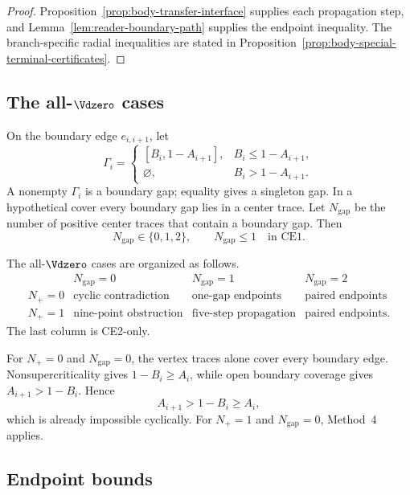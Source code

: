 \begin{proof}
Proposition~\ref{prop:body-transfer-interface} supplies each propagation step,
and Lemma~\ref{lem:reader-boundary-path} supplies the endpoint inequality.
The branch-specific radial inequalities are stated in
Proposition~\ref{prop:body-special-terminal-certificates}.
\end{proof}

\subsection{The all-$\Vdzero$ cases}

\begin{definition}
\label{def:body-active-gap-rank}
On the boundary edge $e_{i,i+1}$, let
\[
 \Gamma_i=
 \begin{cases}
 [B_i,1-A_{i+1}],&B_i\le1-A_{i+1},\\
 \varnothing,&B_i>1-A_{i+1}.
 \end{cases}
\]
A nonempty $\Gamma_i$ is a boundary gap; equality gives a singleton gap.  In
a hypothetical cover every boundary gap lies in a center trace.  Let
$N_{\mathrm{gap}}$ be the number of positive center traces that contain a
boundary gap.  Then
\[
 N_{\mathrm{gap}}\in\{0,1,2\},
 \qquad
 N_{\mathrm{gap}}\le1\quad\text{in CE1}.
\]
\end{definition}

The all-$\Vdzero$ cases are organized as follows.
\[
\begin{array}{c|ccc}
 &N_{\mathrm{gap}}=0&N_{\mathrm{gap}}=1&N_{\mathrm{gap}}=2\\ \hline
N_+=0&\text{cyclic contradiction}&\text{one-gap endpoints}&
       \text{paired endpoints}\\
N_+=1&\text{nine-point obstruction}&\text{five-step propagation}&
       \text{paired endpoints}.
\end{array}
\]
The last column is CE2-only.

For $N_+=0$ and $N_{\mathrm{gap}}=0$, the vertex traces alone cover every
boundary edge.  Nonsupercriticality gives $1-B_i\ge A_i$, while open boundary
coverage gives $A_{i+1}>1-B_i$.  Hence
\[
 A_{i+1}>1-B_i\ge A_i,
\]
which is already impossible cyclically.  For $N_+=1$ and
$N_{\mathrm{gap}}=0$, Method~4 applies.

\subsection{Endpoint bounds}

